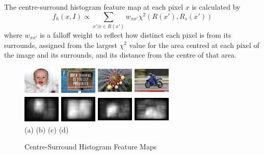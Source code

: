 \documentclass[10pt,twocolumn,letterpaper]{article}
\newcommand{\SUM}{\sum\limits}
\newcommand{\hs}{\hspace{0.58in}}
\begin{document}
The centre-surround histogram feature map at each pixel $x$ is calculated by$$f_h(x,I)\propto\SUM_{x'|x\in R(x')}w_{xx'}\chi^2(R(x'),R_s(x'))$$where $w_{xx'}$ is a falloff weight to reflect how distinct each pixel is from its surrounds, assigned from the largest $\chi^2$ value for the area centred at each pixel of the image and its surrounds, and its distance from the centre of that area. 

\begin{figure}[b]
    \begin{center}
    \includegraphics[width=0.7in,height=0.54in]{./Figures/CSH_image/1orig.jpg}
    \includegraphics[width=0.7in,height=0.54in]{./Figures/CSH_image/2orig.jpg}
    \includegraphics[width=0.7in,height=0.54in]{./Figures/CSH_image/3orig.jpg}
    \includegraphics[width=0.7in,height=0.54in]{./Figures/CSH_image/4orig.jpg}\\
    \includegraphics[width=0.7in,height=0.54in]{./Figures/CSH_image/1cont.jpg}
    \includegraphics[width=0.7in,height=0.54in]{./Figures/CSH_image/2cont.jpg}
    \includegraphics[width=0.7in,height=0.54in]{./Figures/CSH_image/3cont.jpg}
    \includegraphics[width=0.7in,height=0.54in]{./Figures/CSH_image/4cont.jpg}\\
    \footnotesize \hspace{0.1cm} (a) \hs (b) \hs  (c) \hs (d) \\
    \caption{Centre-Surround Histogram Feature Maps} \label{Fig:RegionalFeatureMap}
    \end{center}
\end{figure}
\end{document}
